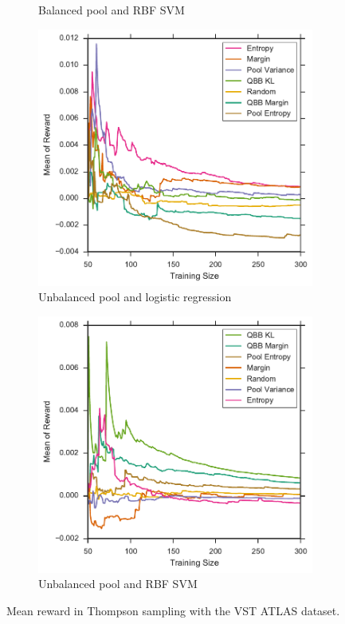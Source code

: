 \begin{figure}[p]
\begin{subfigure}{.5\textwidth}
		\caption{Balanced pool and RBF SVM}
		\label{fig:vstatlas_br_avg_rewards}
	\end{subfigure}
	\begin{subfigure}{.5\textwidth}
		\centering
		\includegraphics[width=\textwidth]{figures/5_thompson/vstatlas_ul_avg_rewards}
		\caption{Unbalanced pool and logistic regression}
		\label{fig:vstatlas_ul_avg_rewards}
	\end{subfigure}%
	\begin{subfigure}{.5\textwidth}
		\centering
		\includegraphics[width=\linewidth]{figures/5_thompson/vstatlas_ur_avg_rewards}
		\caption{Unbalanced pool and RBF SVM}
		\label{fig:vstatlas_ur_avg_rewards}
	\end{subfigure}
	\caption[Mean reward of heuristics (VST ATLAS)]{
		Mean reward in Thompson sampling with the VST ATLAS dataset.}
	\label{fig:vstatlas_avg_rewards}
\end{figure}
